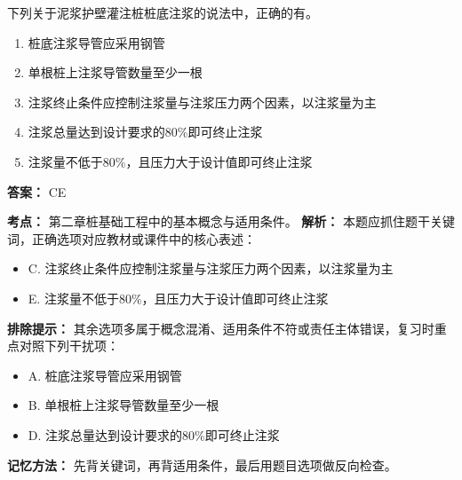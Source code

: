 \documentclass[UTF8,fontset=fandol,11pt]{ctexart}
\begin{document}
\begin{quizbox}[title={第 4 题}]
下列关于泥浆护壁灌注桩桩底注浆的说法中，正确的有。\\
\begin{enumerate}[label=\Alph*.]
\item 桩底注浆导管应采用钢管
\item 单根桩上注浆导管数量至少一根
\item 注浆终止条件应控制注浆量与注浆压力两个因素，以注浆量为主
\item 注浆总量达到设计要求的80\%即可终止注浆
\item 注浆量不低于80\%，且压力大于设计值即可终止注浆
\end{enumerate}
\textbf{答案：} CE
\vspace{0.25em}
\begin{answerbox}[title={考点解析}]
\textbf{考点：} 第二章桩基础工程中的基本概念与适用条件。
\textbf{解析：} 本题应抓住题干关键词，正确选项对应教材或课件中的核心表述：
\begin{itemize}
\item C. 注浆终止条件应控制注浆量与注浆压力两个因素，以注浆量为主
\item E. 注浆量不低于80\%，且压力大于设计值即可终止注浆
\end{itemize}
\textbf{排除提示：} 其余选项多属于概念混淆、适用条件不符或责任主体错误，复习时重点对照下列干扰项：
\begin{itemize}
\item A. 桩底注浆导管应采用钢管
\item B. 单根桩上注浆导管数量至少一根
\item D. 注浆总量达到设计要求的80\%即可终止注浆
\end{itemize}
\textbf{记忆方法：} 先背关键词，再背适用条件，最后用题目选项做反向检查。
\end{answerbox}
\end{quizbox}
\end{document}
